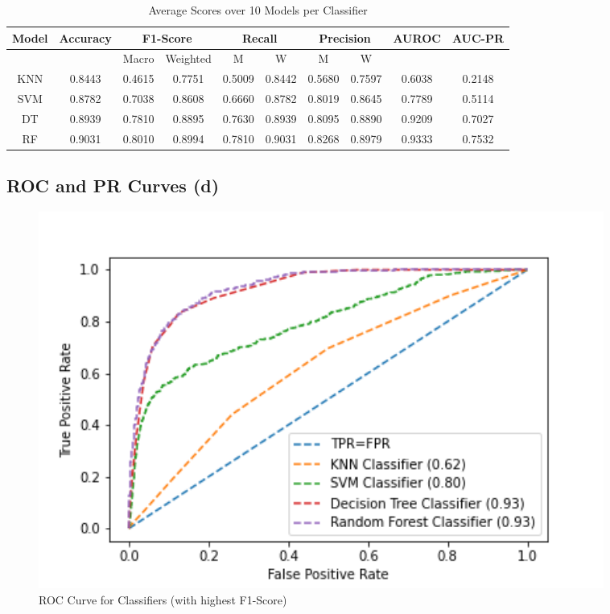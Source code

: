 \documentclass{article}
\begin{document}
\begin{table}[H]
\centering
\begin{tabular}{| c || c | c | c | c | c | c | c | c | c |} 
\hline 
 Model & Accuracy & \multicolumn{2}{|c|}{F1-Score} & \multicolumn{2}{|c|}{Recall} & \multicolumn{2}{|c|}{Precision} & AUROC & AUC-PR \\ \hline
 &  & Macro & Weighted & M & W & M & W & &    \\ \hline 
\hline\hline
KNN &  \cellcolor{red!25}0.8443 & \cellcolor{red!25}0.4615 & \cellcolor{red!25}0.7751 & \cellcolor{red!25}0.5009 & \cellcolor{red!25}0.8442 & \cellcolor{red!25}0.5680 & \cellcolor{red!25}0.7597 & \cellcolor{red!25}0.6038 & \cellcolor{red!25}0.2148  \\ \hline 
SVM & 0.8782 & 0.7038 & 0.8608 & 0.6660 & 0.8782 & 0.8019 & 0.8645 & 0.7789 & 0.5114  \\ \hline 
DT &  0.8939 & 0.7810 & 0.8895 & 0.7630 & 0.8939 & 0.8095 & 0.8890 & 0.9209 & 0.7027  \\ \hline 
RF &  \cellcolor{green!25}0.9031 & \cellcolor{green!25}0.8010 & \cellcolor{green!25}0.8994 & \cellcolor{green!25}0.7810 & \cellcolor{green!25}0.9031 & \cellcolor{green!25}0.8268 & \cellcolor{green!25}0.8979 & \cellcolor{green!25}0.9333 & \cellcolor{green!25}0.7532  \\ \hline 
\end{tabular}
\caption{Average Scores over 10 Models per Classifier}
\label{tab:scores}
\end{table}

\subsection{ROC and PR Curves (d)}

\begin{figure}[H]
\includegraphics[width=0.90\textwidth]{ROCCurve}
\caption{ROC Curve for Classifiers (with highest F1-Score)}
\label{fig:rocCurve}
\end{figure}
\end{document}
